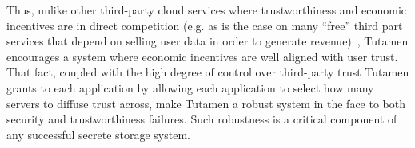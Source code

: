 Thus, unlike other third-party cloud services where trustworthiness
and economic incentives are in direct competition (e.g. as is the case
on many ``free'' third part services that depend on selling user data
in order to generate revenue)~\cite{flowerday2006}, Tutamen encourages
a system where economic incentives are well aligned with user
trust. That fact, coupled with the high degree of control over
third-party trust Tutamen grants to each application by allowing each
application to select how many servers to diffuse trust across, make
Tutamen a robust system in the face to both security and
trustworthiness failures. Such robustness is a critical component of
any successful secrete storage system.


